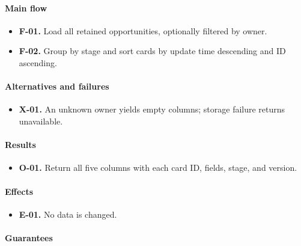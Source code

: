 \documentclass[10pt,a4paper]{article}
\begin{document}
\paragraph{Main flow}

\begin{itemize}

\item \textbf{F-01.} Load all retained opportunities, optionally filtered by owner.

\item \textbf{F-02.} Group by stage and sort cards by update time descending and ID ascending.

\end{itemize}

\paragraph{Alternatives and failures}

\begin{itemize}

\item \textbf{X-01.} An unknown owner yields empty columns; storage failure returns unavailable.

\end{itemize}

\paragraph{Results}

\begin{itemize}

\item \textbf{O-01.} Return all five columns with each card ID, fields, stage, and version.

\end{itemize}

\paragraph{Effects}

\begin{itemize}

\item \textbf{E-01.} No data is changed.

\end{itemize}

\paragraph{Guarantees}
\end{document}
